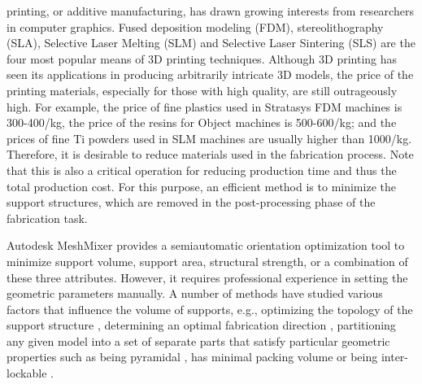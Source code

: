 


 printing, or additive manufacturing, has drawn growing interests from researchers in computer graphics. Fused deposition modeling (FDM), stereolithography (SLA), Selective Laser Melting (SLM) and Selective Laser Sintering (SLS) are the four most popular means of 3D printing techniques. Although 3D printing has seen its applications in producing arbitrarily intricate 3D models, the price of the printing materials, especially for those with high quality, are still outrageously high. {\color{red} For example, the price of fine plastics used in Stratasys FDM machines is 300-400\textdollar /kg, the price of the resins for Object machines is 500-600\textdollar /kg; and the prices of fine Ti powders used in SLM machines are usually higher than 1000\textdollar /kg.} Therefore, it is desirable to reduce materials used in the fabrication process. Note that this is also a critical operation for reducing production time and thus the total production cost. For this purpose, an efficient method is to minimize the support structures, which are removed in the post-processing phase of the fabrication task.

Autodesk MeshMixer provides a semiautomatic orientation optimization tool to minimize support volume, support area, structural strength, or a combination of these three attributes. However, it requires professional experience in setting the geometric parameters manually. A number of methods have studied various factors that influence the volume of supports, e.g., optimizing the topology of the support structure \cite{DumasHL14,VanekGB14}, determining an optimal fabrication direction \cite{Zhang:2015,HildebrandBA13,padhye2011multi}, partitioning any given model into a set of separate parts that satisfy particular geometric properties such as being pyramidal \cite{Hu_siga14}, has minimal packing volume \cite{VanekGBMCSM14} or being inter-lockable \cite{SongFLF15}.



